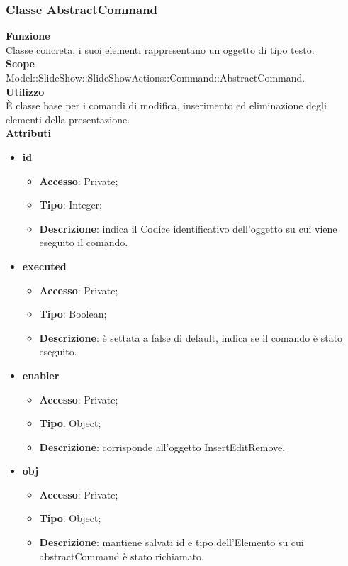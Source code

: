 {{	\subsubsection{Classe AbstractCommand}{
		\textbf{Funzione}\\
			\indent Classe concreta, i suoi elementi rappresentano un oggetto di tipo testo.\\
	   	\textbf{Scope}\\
			\indent Model::SlideShow::SlideShowActions::Command::AbstractCommand.\\
		\textbf{Utilizzo}\\
			\indent È classe base per i comandi di modifica, inserimento ed eliminazione degli elementi della presentazione.\\
		\textbf{Attributi}
		\begin{itemize}
			\item \textbf{id}
			\begin{itemize}
				\item \textbf{Accesso}: Private;
				\item \textbf{Tipo}: Integer;
				\item \textbf{Descrizione}: indica il Codice identificativo dell’oggetto su cui viene eseguito il comando.
			\end{itemize}
			\item \textbf{executed}
			\begin{itemize}
				\item \textbf{Accesso}: Private;
				\item \textbf{Tipo}: Boolean;
				\item \textbf{Descrizione}: è settata a false di default, indica se il comando è stato eseguito.
			\end{itemize}
			\item \textbf{enabler}
			\begin{itemize}
				\item \textbf{Accesso}: Private;
				\item \textbf{Tipo}: Object;
				\item \textbf{Descrizione}: corrisponde all'oggetto InsertEditRemove.
			\end{itemize}
			\item \textbf{obj}
			\begin{itemize}
				\item \textbf{Accesso}: Private;
				\item \textbf{Tipo}: Object;
				\item \textbf{Descrizione}: mantiene salvati id e tipo dell'Elemento su cui abstractCommand è stato richiamato.
			\end{itemize}
		\end{itemize}
		
}}}

